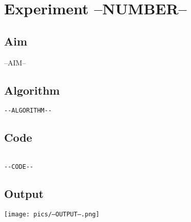 \section*{Experiment --NUMBER-- }


\vspace{20px}
\subsection{Aim}
--AIM--
\subsection{Algorithm}
\begin{verbatim}
--ALGORITHM--
\end{verbatim}
\newpage

\subsection{Code}
\begin{lstlisting}[label={list:first}]

--CODE--

\end{lstlisting}
\subsection{Output}
\texttt{[image: pics/--OUTPUT--.png]}

\newpage

